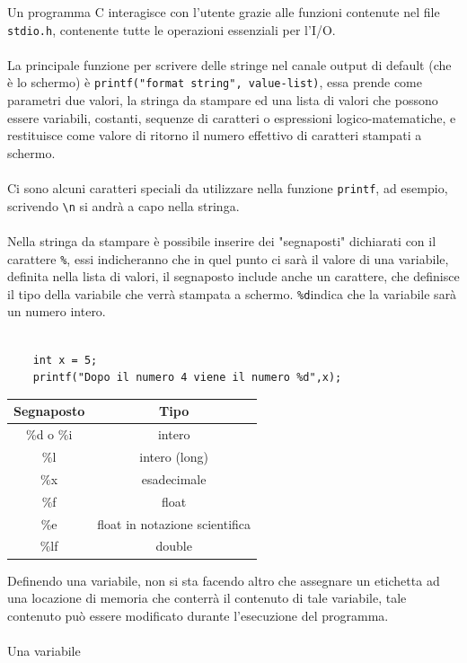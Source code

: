 \documentclass[12pt, letterpaper]{article}
\newcommand{\code}[1]{\colorbox{light-gray}{\texttt{#1}}}
\newcommand{\acc}{\\\hphantom{}\\}
\begin{document}
Un programma C interagisce con l'utente grazie alle funzioni contenute nel file \code{stdio.h}, contenente tutte le 
operazioni essenziali per l'I/O.\acc  La principale funzione per scrivere delle stringe nel canale output di default (che è 
lo schermo) è \code{printf("format string", value-list)}, essa prende come parametri due valori, la stringa da stampare 
ed una lista di valori che possono essere variabili, costanti, sequenze di caratteri o espressioni logico-matematiche, e restituisce 
come valore di ritorno il numero effettivo di caratteri stampati a schermo.\acc 
Ci sono alcuni caratteri speciali da utilizzare nella funzione \code{printf}, ad esempio, scrivendo 
\code{\textbackslash n} si andrà a capo nella stringa.\acc 
Nella stringa da stampare è possibile inserire dei "segnaposti" dichiarati con il carattere \code{\%}, essi indicheranno che 
in quel punto ci sarà il valore di una variabile, definita nella lista di valori, il segnaposto include anche un carattere,
che definisce il tipo della variabile che verrà stampata a schermo. 
\code{\%d}indica che la variabile sarà un numero intero.\begin{lstlisting}[style=CStyle]

    int x = 5;
    printf("Dopo il numero 4 viene il numero %d",x); 
    \end{lstlisting}\begin{center}
        \begin{tabular}{|c|c|}
            \hline
            \rowcolor[HTML]{C0C0C0} 
            Segnaposto & Tipo                           \\ \hline
            \%d o \%i  & intero                         \\ \hline
            \%l        & intero (long)                  \\ \hline
            \%x        & esadecimale                    \\ \hline
            \%f        & float                          \\ \hline
            \%e        & float in notazione scientifica \\ \hline
            \%lf       & double                         \\ \hline
            \end{tabular}
    \end{center}
Definendo una variabile, non si sta facendo altro che assegnare un etichetta ad una locazione di memoria che conterrà il contenuto 
di tale variabile, tale contenuto può essere modificato durante l'esecuzione del programma. \acc Una variabile 
\end{document}
